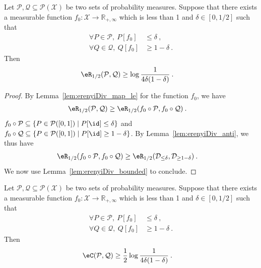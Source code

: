 \begin{theorem}\label{thm:erenyiDiv_lower_bound}
  \leanok
Let $\mathcal{P},\mathcal{Q} \subseteq \mathcal{P}(\mathcal{X})$ be two sets of probability measures.
Suppose that there exists a measurable function $f_0 : \mathcal{X} \to \mathbb{R}_{+,\infty}$ which is less than 1 and $\delta \in [0,1/2]$ such that
\begin{align*}
  \forall P \in \mathcal{P}, \: P[f_0] &\le \delta
  \: , \\
  \forall Q \in \mathcal{Q}, \: Q[f_0] &\ge 1 - \delta
  \: .
\end{align*}
Then
\begin{align*}
  \eR_{1/2}(\mathcal{P}, \mathcal{Q})
  &\ge \log \frac{1}{4\delta(1 - \delta)}
  \: .
\end{align*}
\end{theorem}

\begin{proof}\leanok
By Lemma~\ref{lem:erenyiDiv_map_le} for the function $f_0$, we have
\begin{align*}
  \eR_{1/2}(\mathcal{P}, \mathcal{Q})
  &\ge \eR_{1/2}(f_0 \circ \mathcal{P}, f_0 \circ \mathcal{Q})
  \: .
\end{align*}
$f_0 \circ \mathcal{P} \subseteq \{P \in \mathcal{P}([0,1]) \mid P[\id] \le \delta\}$ and $f_0 \circ \mathcal{Q} \subseteq \{P \in \mathcal{P}([0,1]) \mid P[\id] \ge 1 - \delta\}$.
By Lemma~\ref{lem:erenyiDiv_anti}, we thus have
\begin{align*}
  \eR_{1/2}(f_0 \circ \mathcal{P}, f_0 \circ \mathcal{Q})
  &\ge \eR_{1/2}(\mathcal{D}_{\le \delta}, \mathcal{D}_{\ge 1 - \delta})
  \: .
\end{align*}
We now use Lemma~\ref{lem:erenyiDiv_bounded} to conclude.
\end{proof}


\begin{theorem}\label{thm:echernoffDiv_lower_bound}
  \leanok
Let $\mathcal{P},\mathcal{Q} \subseteq \mathcal{P}(\mathcal{X})$ be two sets of probability measures.
Suppose that there exists a measurable function $f_0 : \mathcal{X} \to \mathbb{R}_{+,\infty}$ which is less than 1 and $\delta \in [0,1/2]$ such that
\begin{align*}
  \forall P \in \mathcal{P}, \: P[f_0] &\le \delta
  \: , \\
  \forall Q \in \mathcal{Q}, \: Q[f_0] &\ge 1 - \delta
  \: .
\end{align*}
Then
\begin{align*}
  \eC(\mathcal{P}, \mathcal{Q})
  &\ge \frac{1}{2} \log \frac{1}{4\delta(1 - \delta)}
  \: .
\end{align*}
\end{theorem}

